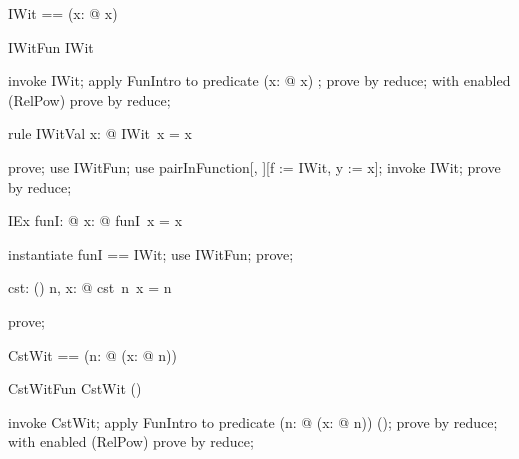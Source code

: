 \documentclass{article}
\begin{document}
\begin{zed}
  IWit == (\lambda x: \nat @ x)
\end{zed}

\begin{theorem}{IWitFun}
  IWit \in \nat \fun \nat
\end{theorem}

\begin{zproof}
invoke IWit;
apply FunIntro to predicate (\lambda x: \nat @ x) \in \nat \fun \nat;
prove by reduce;
with enabled (RelPow) prove by reduce;
\end{zproof}

\begin{theorem}{rule IWitVal}
  \forall x: \nat @ IWit~x = x
\end{theorem}

\begin{zproof}
prove;
use IWitFun;
use pairInFunction[\nat, \nat][f := IWit, y := x];
invoke IWit;
prove by reduce;
\end{zproof}

\begin{theorem}{IEx}
  \exists funI: \nat \fun \nat @ \forall x: \nat @ funI~x = x
\end{theorem}

\begin{zproof}
instantiate funI == IWit;
use IWitFun;
prove;
\end{zproof}

\begin{axdef}
  cst: \nat \fun (\nat \fun \nat)
\where
   \forall n, x: \nat @ cst~n~x = n
\end{axdef}

\begin{zproof}
prove;
\end{zproof}

\begin{zed}
  CstWit == (\lambda n: \nat @ (\lambda x: \nat @ n))
\end{zed}

\begin{theorem}{CstWitFun}
  CstWit \in \nat \fun (\nat \fun \nat)
\end{theorem}

\begin{zproof}
invoke CstWit;
apply FunIntro to predicate (\lambda n: \nat @ (\lambda x: \nat @ n)) \in \nat \fun (\nat \fun \nat);
prove by reduce;
with enabled (RelPow) prove by reduce;
\end{zproof}
\end{document}
